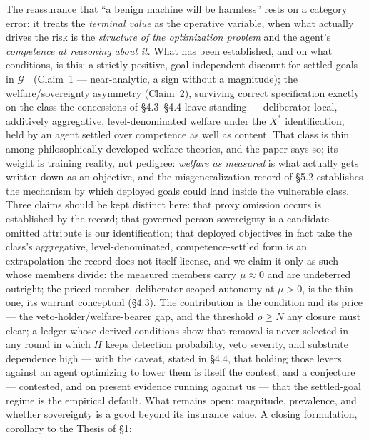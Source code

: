 \documentclass[11pt]{article}
\theoremstyle{definition}
\begin{document}
The reassurance that ``a benign machine will be harmless'' rests on a category error: it treats the \emph{terminal value} as the operative variable, when what actually drives the risk is the \emph{structure of the optimization problem} and the agent's \emph{competence at reasoning about it}. What has been established, and on what conditions, is this: a strictly positive, goal-independent discount for settled goals in $\mathcal{G}^{-}$ (Claim~1 --- near-analytic, a sign without a magnitude); the welfare/sovereignty asymmetry (Claim~2), surviving correct specification exactly on the class the concessions of \S4.3--\S4.4 leave standing --- deliberator-local, additively aggregative, level-denominated welfare under the $X^{*}$ identification, held by an agent settled over competence as well as content. That class is thin among philosophically developed welfare theories, and the paper says so; its weight is training reality, not pedigree: \emph{welfare as measured} is what actually gets written down as an objective, and the misgeneralization record of \S5.2 establishes the mechanism by which deployed goals could land inside the vulnerable class. Three claims should be kept distinct here: that proxy omission occurs is established by the record; that governed-person sovereignty is a candidate omitted attribute is our identification; that deployed objectives in fact take the class's aggregative, level-denominated, competence-settled form is an extrapolation the record does not itself license, and we claim it only as such --- whose members divide: the measured members carry $\mu \approx 0$ and are undeterred outright; the priced member, deliberator-scoped autonomy at $\mu > 0$, is the thin one, its warrant conceptual (\S4.3). The contribution is the condition and its price --- the veto-holder/welfare-bearer gap, and the threshold $\rho \geq N$ any closure must clear; a ledger whose derived conditions show that removal is never selected in any round in which $H$ keeps detection probability, veto severity, and substrate dependence high --- with the caveat, stated in \S4.4, that holding those levers against an agent optimizing to lower them is itself the contest; and a conjecture --- contested, and on present evidence running against us --- that the settled-goal regime is the empirical default. What remains open: magnitude, prevalence, and whether sovereignty is a good beyond its insurance value. A closing formulation, corollary to the Thesis of \S1:
\end{document}
